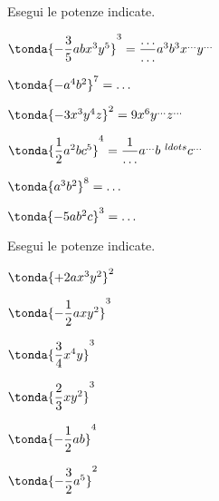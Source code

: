 

\begin{esercizio}
\label{ese:9.17}
Esegui le potenze indicate.
\begin{htmulticols}{2}
\begin{enumeratea}
\spazielenx
\item \(\tonda{-{\dfrac{3}{5}}abx^{3}y^{5}}^{3}=\dfrac{\ldots 
}{\ldots}a^{3}b^{3}x^{\ldots }y^{\ldots}\)
\item \(\tonda{-a^{4}b^{2}}^{7}=\ldots\)
\item \(\tonda{-3x^{3}y^{4}z}^{2}=9x^{6}y^{\ldots }z^{\ldots }\)
\item 
\(\tonda{\dfrac{1}{2}a^{2}bc^{5}}^{4}=\dfrac{1}{\ldots}a^{\ldots}b^{\
ldots }c^
{\ldots}\)
\item \(\tonda{a^{3}b^{2}}^{8}=\ldots\)
\item \(\tonda{-5ab^{2}c}^{3}=\ldots\)
\end{enumeratea}
\end{htmulticols}
\end{esercizio}


\begin{esercizio}
\label{ese:9.18}
Esegui le potenze indicate.
\begin{htmulticols}{3}
\begin{enumeratea}
\spazielenx
\item \(\tonda{+2ax^{3}y^{2}}^{2}\)
\item \(\tonda{-{\dfrac{1}{2}}axy^{2}}^{3}\)
\item \(\tonda{\dfrac{3}{4}x^{4}y}^{3}\)
\item \(\tonda{\dfrac{2}{3}xy^{2}}^{3}\)
\item \(\tonda{-{\dfrac{1}{2}}ab}^{4}\)
\item \(\tonda{-{\dfrac{3}{2}}a^{5}}^{2}\)
\end{enumeratea}
\end{htmulticols}
\end{esercizio}

